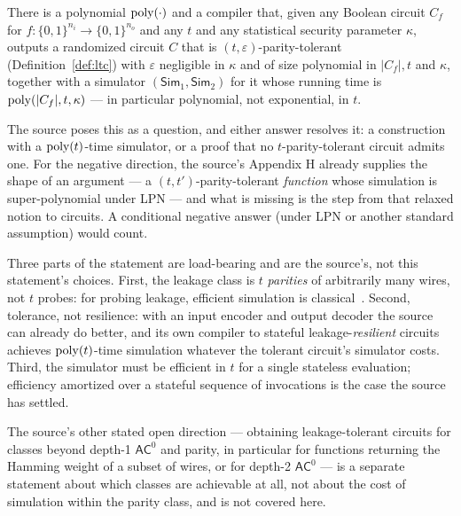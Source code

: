 \documentclass{aicr-conjecture}
\newcommand{\bits}{\{0,1\}}
\newcommand{\eps}{\varepsilon}
\newcommand{\Sim}{\mathsf{Sim}}
\begin{document}
\begin{conjecture}\label{conj:main}
There is a polynomial $\mathrm{poly}(\cdot)$ and a compiler that, given any
Boolean circuit $C_{f}$ for $f : \bits^{n_{i}} \to \bits^{n_{o}}$ and
any $t$ and any statistical security parameter $\kappa$, outputs a
randomized circuit $C$ that is $(t, \eps)$-parity-tolerant
(Definition~\ref{def:ltc}) with $\eps$ negligible in $\kappa$ and of size
polynomial in $|C_{f}|, t$ and $\kappa$, together with a simulator
$(\Sim_{1}, \Sim_{2})$ for it whose running time is $\mathrm{poly}(|C_{f}|, t,
\kappa)$ --- in particular polynomial, not exponential, in $t$.
\end{conjecture}

\begin{remark}
The source poses this as a question, and either answer resolves it:
a construction with a $\mathrm{poly}(t)$-time simulator, or a proof that no
$t$-parity-tolerant circuit admits one. For the negative direction, the
source's Appendix H already supplies the shape of an argument --- a
$(t,t')$-parity-tolerant \emph{function} whose simulation is
super-polynomial under LPN --- and what is missing is the step from that
relaxed notion to circuits. A conditional negative answer (under LPN or
another standard assumption) would count.
\end{remark}

\begin{remark}
Three parts of the statement are load-bearing and are the source's, not
this statement's choices. First, the leakage class is $t$ \emph{parities}
of arbitrarily many wires, not $t$ probes: for probing leakage,
efficient simulation is classical~\cite{ISW03}. Second, tolerance, not
resilience: with an input encoder and output decoder the source can
already do better, and its own compiler to stateful leakage-\emph{resilient}
circuits achieves $\mathrm{poly}(t)$-time simulation whatever the tolerant
circuit's simulator costs. Third, the simulator must be efficient in
$t$ for a single stateless evaluation; efficiency amortized over a
stateful sequence of invocations is the case the source has settled.
\end{remark}

\begin{remark}
The source's other stated open direction --- obtaining leakage-tolerant
circuits for classes beyond depth-1 $\mathsf{AC}^{0}$ and parity, in
particular for functions returning the Hamming weight of a subset of
wires, or for depth-2 $\mathsf{AC}^{0}$ --- is a separate statement about
which classes are achievable at all, not about the cost of simulation
within the parity class, and is not covered here.
\end{remark}
\end{document}
